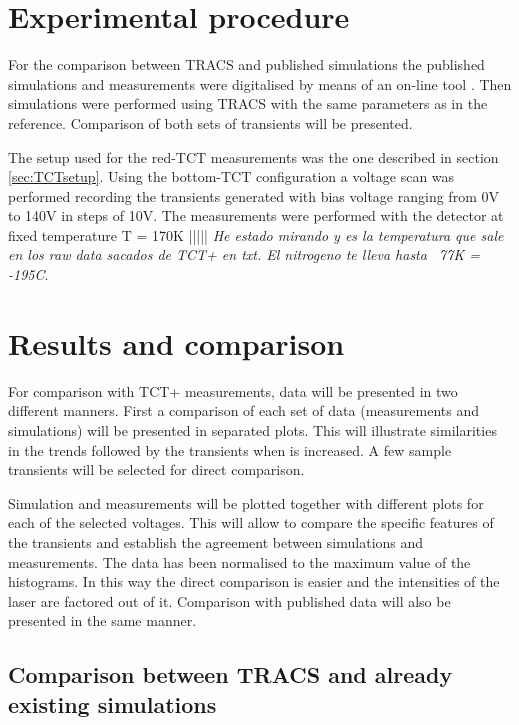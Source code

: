 \section{Experimental procedure} %
\label{sec:ExpProc}

For the comparison between TRACS and published simulations the published simulations and measurements were digitalised by means of an on-line tool \cite{digitiser}. Then simulations were performed using TRACS with the same parameters as in the reference. Comparison of both sets of transients will be presented.

The setup used for the red-TCT measurements was the one described in section \ref{sec:TCTsetup}. Using the bottom-TCT configuration a voltage scan was performed recording the transients generated with bias voltage ranging from 0V to 140V in steps of 10V. The measurements were performed with the detector at fixed temperature T = 170K ||||| \emph{He estado mirando y es la temperatura que sale en los raw data sacados de TCT+ en txt. El nitrogeno te lleva hasta ~77K = -195C}. 


\section{Results and comparison} %
\label{sec:comparison}

For comparison with TCT+ measurements, data will be presented in two different manners. First a comparison of each set of data (measurements and simulations) will be presented in separated plots. This will illustrate similarities in the trends followed by the transients when \vias is increased. A few sample transients will be selected for direct comparison. 

Simulation and measurements will be plotted together with different plots for each of the selected voltages. This will allow to compare the specific features of the transients and establish the agreement between simulations and measurements. The data has been normalised to the maximum value of the histograms. In this way the direct comparison is easier and the intensities of the laser are factored out of it. Comparison with published data will also be presented in the same manner.

\subsection{Comparison between TRACS and already existing simulations}

